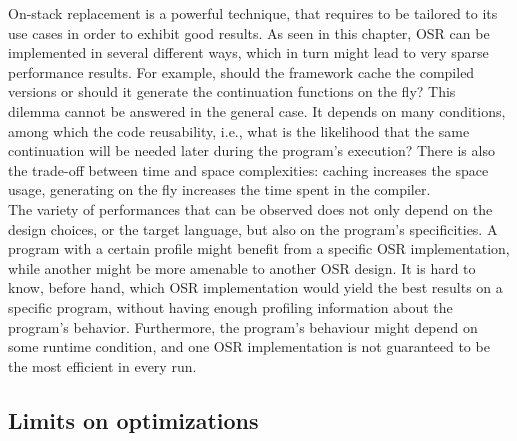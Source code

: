 On-stack replacement is a powerful technique, that requires to be tailored to its use cases in order to exhibit good results.
As seen in this chapter, OSR can be implemented in several different ways, which in turn might lead to very sparse performance results.
For example, should the framework cache the compiled versions or should it generate the continuation functions on the fly?
This dilemma cannot be answered in the general case.
It depends on many conditions, among which the code reusability, i.e., what is the likelihood that the same continuation will be needed later during the program's execution?
There is also the trade-off between time and space complexities: caching increases the space usage, generating on the fly increases the time spent in the compiler.\\

The variety of performances that can be observed does not only depend on the design choices, or the target language, but also on the program's specificities.
A program with a certain profile might benefit from a specific OSR implementation, while another might be more amenable to another OSR design.
It is hard to know, before hand, which OSR implementation would yield the best results on a specific program, without having enough profiling information about the program's behavior. 
Furthermore, the program's behaviour might depend on some runtime condition, and one OSR implementation is not guaranteed to be the most efficient in every run.  

\subsection{Limits on optimizations}


